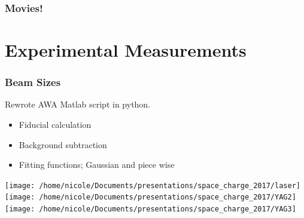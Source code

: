 \documentclass[professionalfonts,t]{beamer}
\newcommand{\secimage}{../../tex/images/awa_gun}
\begin{document}
\begin{frame}
	\frametitle{Movies!}
\end{frame}
{
	\renewcommand{\secimage}{../../tex/images/YAG_screen}
\section{Experimental Measurements}
\begin{frame}
\frametitle{Beam Sizes}
Rewrote AWA Matlab script in python.
\begin{itemize}
	\item Fiducial calculation
	\item Background subtraction 
	\item Fitting functions; Gaussian and piece wise
\end{itemize}	

\vspace{1em}
\centering
\texttt{[image: /home/nicole/Documents/presentations/space\_charge\_2017/laser]}%
\texttt{[image: /home/nicole/Documents/presentations/space\_charge\_2017/YAG2]}%
\texttt{[image: /home/nicole/Documents/presentations/space\_charge\_2017/YAG3]}
\end{frame}

}
\end{document}
